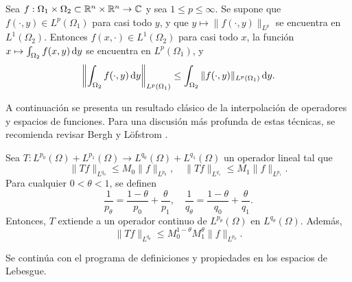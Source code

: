 \begin{proposition}\label{prop:monotonia-Lp}
    Sea $f:\Omega_1 \times \Omega_2 \subset\mathbb{R}^n\times\mathbb{R}^n\rightarrow\mathbb{C}$ y 
    sea $1\leq p\leq\infty$.
    Se supone que $f(\cdot,y)\in L^p(\Omega_1)$ para casi
    todo $y$, y que $y\mapsto \|f(\cdot, y)\|_{L^p}$ se encuentra en
    $L^1(\Omega_2)$. Entonces $f(x, \cdot)\in L^1(\Omega_2)$ para casi
    todo $x$, la función $x\mapsto \int_{\Omega_2} f(x, y)\mathop{}\!\mathrm{d} y$ se encuentra
    en $L^p(\Omega_1)$, y
    \begin{equation*}
        \left\| \int_{\Omega_2} f(\cdot, y)\mathop{}\!\mathrm{d} y
        \right\|_{L^p(\Omega_1)} \leq \int_{\Omega_2} 
        \|f(\cdot, y)\|_{L^p(\Omega_1)} \mathop{}\!\mathrm{d} y.
    \end{equation*}
\end{proposition}
A continuación se presenta un resultado clásico de la interpolación de 
operadores y espacios de funciones. Para una discusión más profunda de estas técnicas, se recomienda revisar Bergh y L\"ofstrom \cite{bergh-lofstrom}.
\begin{theorem}\label{theo:riesz-thorin} 
    Sea $T:L^{p_0}(\Omega)+L^{p_1}(\Omega) \rightarrow 
    L^{q_0}(\Omega)+L^{q_1}(\Omega)$ un operador lineal tal que 
    \begin{equation*}
        \|Tf\|_{L^{q_0}} \leq M_0 \|f\|_{L^{p_0}}, \quad
        \|Tf\|_{L^{q_1}} \leq M_1 \|f\|_{L^{p_1}}.
    \end{equation*}
    Para cualquier $0<\theta<1$, se definen 
    \begin{equation*}
        \frac{1}{p_\theta} = \frac{1-\theta}{p_0} + \frac{\theta}{p_1}, 
        \quad 
        \frac{1}{q_\theta} = \frac{1-\theta}{q_0} + \frac{\theta}{q_1}.
    \end{equation*}
    Entonces, $T$ extiende a un operador continuo de $L^{p_\theta}(\Omega)$
    en $L^{q_\theta}(\Omega)$. Además, 
    \begin{equation*}
        \|Tf\|_{L^{q_\theta}} \leq M_0^{1-\theta}M_1^\theta \|f\|_{L^{p_\theta}}.
    \end{equation*}
\end{theorem}
Se continúa con el programa de definiciones y propiedades en los espacios 
de Lebesgue.

